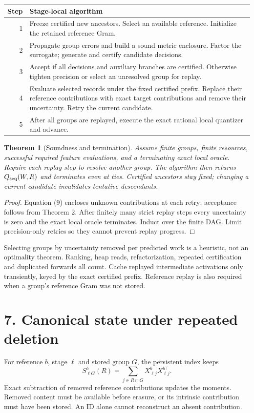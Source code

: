\documentclass[11pt]{article}
\newtheorem{theorem}{Theorem}\newtheorem{lemma}{Lemma}\newtheorem{corollary}{Corollary}
\begin{document}
\begin{tabularx}{\linewidth}{@{}rX@{}}\toprule
Step & Stage-local algorithm\\\midrule
1 & Freeze certified new ancestors. Select an available reference. Initialize the retained reference Gram.\\
2 & Propagate group errors and build a sound metric enclosure. Factor the surrogate; generate and certify candidate decisions.\\
3 & Accept if all decisions and auxiliary branches are certified. Otherwise tighten precision or select an unresolved group for replay.\\
4 & Evaluate selected records under the fixed certified prefix. Replace their reference contributions with exact target contributions and remove their uncertainty. Retry the current candidate.\\
5 & After all groups are replayed, execute the exact rational local quantizer and advance.\\\bottomrule
\end{tabularx}

\begin{theorem}[Soundness and termination]
Assume finite groups, finite resources, successful required feature evaluations, and a terminating exact local oracle. Require each replay step to resolve another group. The algorithm then returns $Q_{\rm seq}(W,R)$ and terminates even at ties. Certified ancestors stay fixed; changing a current candidate invalidates tentative descendants.
\end{theorem}
\begin{proof}
Equation (9) encloses unknown contributions at each retry; acceptance follows from Theorem 2. After finitely many strict replay steps every uncertainty is zero and the exact local oracle terminates. Induct over the finite DAG. Limit precision-only retries so they cannot prevent replay progress.
\end{proof}

Selecting groups by uncertainty removed per predicted work is a heuristic, not an optimality theorem. Ranking, heap reads, refactorization, repeated certification and duplicated forwards all count. Cache replayed intermediate activations only transiently, keyed by the exact certified prefix. Reference replay is also required when a group's reference Gram was not stored.

\newpage
\section*{7. Canonical state under repeated deletion}
For reference $b$, stage $\ell$ and stored group $G$, the persistent index keeps
\[
 S^b_{\ell G}(R)=\sum_{j\in R\cap G}X^b_{\ell j}X^{b\top}_{\ell j}.
\]
Exact subtraction of removed reference contributions updates the moments. Removed content must be available before erasure, or its intrinsic contribution must have been stored. An ID alone cannot reconstruct an absent contribution.
\end{document}

